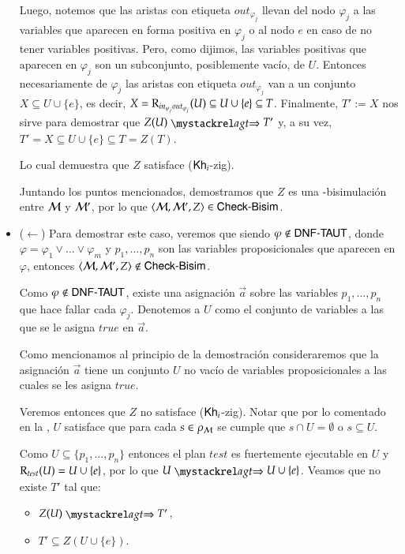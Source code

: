 \begin{demostracion}
\begin{itemize}
    Luego, notemos que las aristas con etiqueta $out_{\varphi_j}$ llevan del nodo $\varphi_j$ a las variables 
    que aparecen en forma positiva en $\varphi_j$ o al nodo $e$ en caso de no tener variables positivas. Pero, como dijimos, 
    las variables positivas que aparecen en $\varphi_j$ son un subconjunto, posiblemente vacío, de $U$.
    Entonces necesariamente de $\varphi_j$ las aristas con etiqueta $out_{\varphi_j}$ van a un conjunto $X \subseteq U \cup \{e\}$, 
    es decir, $X = \mathrm{R}_{in_{\varphi_j}out_{\varphi_j}}(U) \subseteq U \cup \{e\} \subseteq T$. 
    Finalmente, $T' := X$ nos sirve para demostrar que $Z(U) \ultsExecAgagt T'$ y, a su vez, 
    $T' = X \subseteq U \cup \{e\} \subseteq T = Z(T)$.

    Lo cual demuestra que $Z$ satisface ($\mathsf{Kh}_i$-zig). 

    Juntando los puntos mencionados, demostramos que $Z$ es una \KHilogic-bisimulación entre $\mathcal{M}$ y $\mathcal{M}'$, 
    por lo que $\langle \mathcal{M},\mathcal{M}',Z \rangle \in \rm\textsf{Check-Bisim}$. 

    \item ($\leftarrow$) Para demostrar este caso, veremos que siendo $\varphi \notin \rm\textsf{DNF-TAUT}$, 
    donde $\varphi = \varphi_1 \vee ... \vee \varphi_m$ y $p_1,...,p_n$ son las variables proposicionales que aparecen en $\varphi$, 
    entonces $\langle \mathcal{M},\mathcal{M}',Z \rangle \notin \rm\textsf{Check-Bisim}$.

    Como $\varphi \notin \rm\textsf{DNF-TAUT}$, existe una asignación $\overrightarrow{a}$ sobre las variables $p_1,...,p_n$ que hace fallar 
    cada $\varphi_j$. Denotemos a $U$ como el conjunto de variables a las que se le asigna $true$ en $\overrightarrow{a}$.

    Como mencionamos al principio de la demostración consideraremos que la asignación $\overrightarrow{a}$ tiene un conjunto $U$ no vacío 
    de variables proposicionales a las cuales se les asigna $true$.
    
    Veremos entonces que $Z$ no satisface ($\mathsf{Kh}_i$-zig). Notar que por lo comentado en la , $U$ satisface que 
    para cada $s \in \rho_{\mathcal{M}}$ se cumple que $s \cap U = \emptyset$ o $s \subseteq U$. 

    Como $U \subseteq \{p_1,...,p_n\}$ entonces el plan $test$ es fuertemente ejecutable en $U$ y 
    $\mathrm{R}_{test}(U) = U \cup \{e\}$, por lo que $U \ultsExecAgagt U \cup \{e\}$.
    Veamos que no existe $T'$ tal que:
    \begin{multicols}{2}
        \begin{itemize}
            \item $Z(U) \ultsExecAgagt T'$, 
            \item $T' \subseteq Z(U \cup \{e\})$.
        \end{itemize}
    \end{multicols}


\end{itemize}
\end{demostracion}
